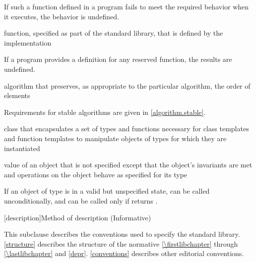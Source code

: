 \begin{defnote}
If such a function defined in a \Cpp{} program fails to meet the required
behavior when it executes, the behavior is undefined.%
\end{defnote}

%
function, specified as part of the \Cpp{} standard library, that is defined by the
implementation

\begin{defnote}
If a \Cpp{} program provides a definition for any reserved function, the results are undefined.%
\end{defnote}

%
%
algorithm that preserves, as appropriate to the particular algorithm, the order
of elements

\begin{defnote}
Requirements for stable algorithms are given in \ref{algorithm.stable}.
\end{defnote}

%
class that encapsulates a set of types and functions necessary for class templates and
function templates to manipulate objects of types for which they are instantiated

%
value of an object that is not specified except that the object's invariants are
met and operations on the object behave as specified for its type

\begin{example}
If an object  of type  is in a
valid but unspecified state,  can be called unconditionally,
and  can be called only if  returns
.
\end{example}

[description]{Method of description (Informative)}

\pnum
This subclause describes the conventions used to specify the \Cpp{} standard
library. \ref{structure} describes the structure of the normative
\ref{\firstlibchapter} through \ref{\lastlibchapter} and
\ref{depr}. \ref{conventions} describes other editorial conventions.

